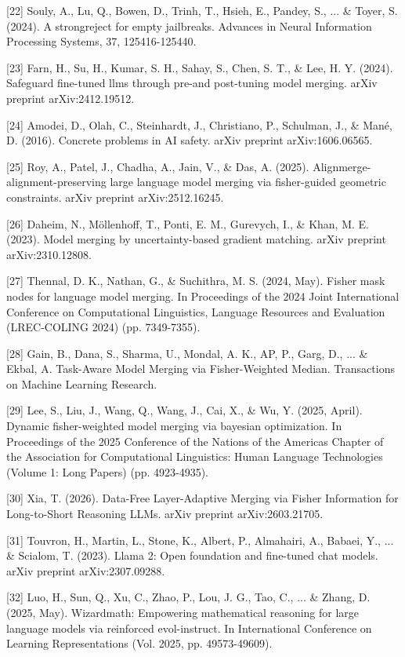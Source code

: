 [22] Souly, A., Lu, Q., Bowen, D., Trinh, T., Hsieh, E., Pandey, S., ... \& Toyer, S. (2024). A strongreject for empty jailbreaks. Advances in Neural Information Processing Systems, 37, 125416-125440.

[23] Farn, H., Su, H., Kumar, S. H., Sahay, S., Chen, S. T., \& Lee, H. Y. (2024). Safeguard fine-tuned llms through pre-and post-tuning model merging. arXiv preprint arXiv:2412.19512.

[24] Amodei, D., Olah, C., Steinhardt, J., Christiano, P., Schulman, J., \& Mané, D. (2016). Concrete problems in AI safety. arXiv preprint arXiv:1606.06565.

[25] Roy, A., Patel, J., Chadha, A., Jain, V., \& Das, A. (2025). Alignmerge-alignment-preserving large language model merging via fisher-guided geometric constraints. arXiv preprint arXiv:2512.16245.

[26] Daheim, N., Möllenhoff, T., Ponti, E. M., Gurevych, I., \& Khan, M. E. (2023). Model merging by uncertainty-based gradient matching. arXiv preprint arXiv:2310.12808.

[27] Thennal, D. K., Nathan, G., \& Suchithra, M. S. (2024, May). Fisher mask nodes for language model merging. In Proceedings of the 2024 Joint International Conference on Computational Linguistics, Language Resources and Evaluation (LREC-COLING 2024) (pp. 7349-7355).

[28] Gain, B., Dana, S., Sharma, U., Mondal, A. K., AP, P., Garg, D., ... \& Ekbal, A. Task-Aware Model Merging via Fisher-Weighted Median. Transactions on Machine Learning Research.

[29] Lee, S., Liu, J., Wang, Q., Wang, J., Cai, X., \& Wu, Y. (2025, April). Dynamic fisher-weighted model merging via bayesian optimization. In Proceedings of the 2025 Conference of the Nations of the Americas Chapter of the Association for Computational Linguistics: Human Language Technologies (Volume 1: Long Papers) (pp. 4923-4935).

[30] Xia, T. (2026). Data-Free Layer-Adaptive Merging via Fisher Information for Long-to-Short Reasoning LLMs. arXiv preprint arXiv:2603.21705.

[31] Touvron, H., Martin, L., Stone, K., Albert, P., Almahairi, A., Babaei, Y., ... \& Scialom, T. (2023). Llama 2: Open foundation and fine-tuned chat models. arXiv preprint arXiv:2307.09288.

[32] Luo, H., Sun, Q., Xu, C., Zhao, P., Lou, J. G., Tao, C., ... \& Zhang, D. (2025, May). Wizardmath: Empowering mathematical reasoning for large language models via reinforced evol-instruct. In International Conference on Learning Representations (Vol. 2025, pp. 49573-49609).

